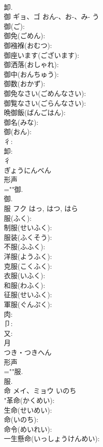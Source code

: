 \documentclass[8pt]{extreport}
\begin{document}
\begin{CJK}{UTF8}{min}
\\	卸.
\\	御	ギョ、ゴ	おん-、お-、み-	う	
\\	御(ご): 
\\	御免(ごめん): 
\\	御襁褓(おむつ): 
\\	御座います(ございます): 
\\	御洒落(おしゃれ): 
\\	御中(おんちゅう): 
\\	御数(おかず): 
\\	御免なさい(ごめんなさい): 
\\	御覧なさい(ごらんなさい): 
\\	晩御飯(ばんごはん): 
\\	御名(みな): 
\\	御(おん): 
\\	彳: 
\\	卸: 
\\	彳	
\\	ぎょうにんべん	
\\	形声 
\\	=""御.
\\	御.
\\	服	フク		はっ, はつ, はら	
\\	服(ふく): 
\\	制服(せいふく): 
\\	服装(ふくそう): 
\\	不服(ふふく): 
\\	洋服(ようふく): 
\\	克服(こくふく): 
\\	衣服(いふく): 
\\	和服(わふく): 
\\	征服(せいふく): 
\\	軍服(ぐんぷく): 
\\	肉: 
\\	卩: 
\\	又: 
\\	月	
\\	つき・つきへん	
\\	形声 
\\	=""服.
\\	服.
\\	命	メイ、ミョウ	いのち		
\\	"革命(かくめい): 
\\	生命(せいめい): 
\\	命(いのち): 
\\	命令(めいれい): 
\\	一生懸命(いっしょうけんめい): 

\end{CJK}
\end{document}
